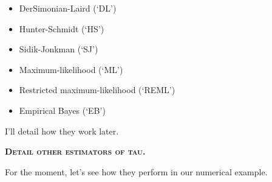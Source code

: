 \documentclass[]{book}
\providecommand{\tightlist}{%
  \setlength{\itemsep}{0pt}\setlength{\parskip}{0pt}}
\theoremstyle{definition}
\theoremstyle{definition}
\theoremstyle{definition}
\theoremstyle{remark}
\let\BeginKnitrBlock\begin \let\EndKnitrBlock\end
\begin{document}
\begin{itemize}
\tightlist
\item
  DerSimonian-Laird (`DL')
\item
  Hunter-Schmidt (`HS')
\item
  Sidik-Jonkman (`SJ')
\item
  Maximum-likelihood (`ML')
\item
  Restricted maximum-likelihood (`REML')
\item
  Empirical Bayes (`EB')
\end{itemize}

I'll detail how they work later.

\textbf{\textsc{Detail other estimators of tau.}}

\BeginKnitrBlock{example}
\protect\hypertarget{exm:unnamed-chunk-151}{}{\label{exm:unnamed-chunk-151}
}For the moment, let's see how they perform in our numerical example.
\EndKnitrBlock{example}
\end{document}
